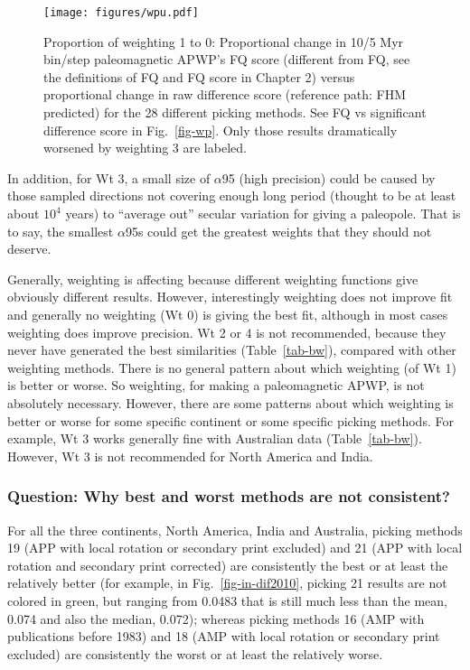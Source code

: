 \begin{figure*}
\centering
\texttt{[image: figures/wpu.pdf]}
\caption[Proportional changes of weighting 1-5 to 0: Paleomagnetic APWP's FQ
score versus raw difference score]{Proportion of weighting 1 to 0:
Proportional change in 10/5 Myr bin/step paleomagnetic APWP's FQ score
(different from FQ, see the definitions of FQ and FQ score in Chapter 2) versus
proportional change in raw difference score (reference path: FHM predicted) for
the 28 different picking methods. See FQ vs significant difference score in
Fig.~\ref{fig-wp}. Only those results dramatically worsened by weighting 3 are
labeled.}\label{fig-wpu}
\end{figure*}

In addition, for Wt 3, a small size of $\alpha$95 (high precision) could be
caused by those sampled directions not covering enough long period (thought to
be at least about $10^4$ years) to ``average out'' secular variation for giving
a paleopole. That is to say, the smallest $\alpha$95s could get the greatest
weights that they should not deserve.

Generally, weighting is affecting because different weighting functions give
obviously different results. However, interestingly weighting does not improve
fit and generally no weighting (Wt 0) is giving the best fit, although in most
cases weighting does improve precision. Wt 2 or 4 is not recommended, because
they never have generated the best similarities (Table~\ref{tab-bw}), compared
with other weighting methods. There is no general pattern about which weighting
(of Wt 1) is better or worse. So weighting, for making a
paleomagnetic APWP, is not absolutely necessary. However, there are some
patterns about which weighting is better or worse for some specific continent or
some specific picking methods. For example, Wt 3 works generally fine with
Australian data (Table~\ref{tab-bw}). However, Wt 3 is not recommended for North
America and India.

\subsubsection{Question: Why best and worst methods are not consistent?}

For all the three continents, North America, India and Australia, picking
methods 19 (APP with local rotation or secondary print excluded) and 21 (APP
with local rotation and secondary print corrected) are consistently the best or
at least the relatively better (for example, in Fig.~\ref{fig-in-dif2010},
picking 21 results are not colored in green, but ranging from
0.0483 that is still much less than the mean, 0.074 and also
the median, 0.072); whereas picking methods 16 (AMP with publications before
1983) and 18 (AMP with local rotation or secondary print excluded) are
consistently the worst or at least the relatively worse.

